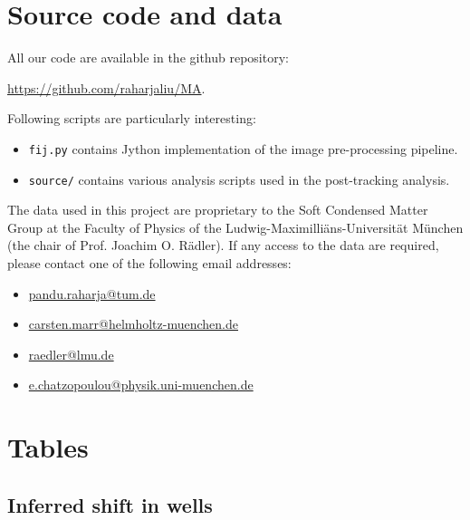 \documentclass[pdftex,12pt,a4paper]{report}
\begin{document}
\begin{appendices}
\newpage

\chapter{Source code and data}

{
\flushleft

All our code are available in the github repository:

\begin{center}
\href{https://github.com/raharjaliu/MA}{https://github.com/raharjaliu/MA}.
\end{center}

Following scripts are particularly interesting:

\begin{itemize}
\item \texttt{fij.py} contains Jython implementation of the image pre-processing pipeline.
\item \texttt{source/} contains various analysis scripts used in the post-tracking analysis.
\end{itemize}
}

The data used in this project are proprietary to the Soft Condensed Matter Group at the Faculty of Physics of the Ludwig-Maximilli\"ans-Universit\"at M\"unchen (the chair of Prof. Joachim O. R\"adler). If any access to the data are required, please contact one of the following email addresses:

\begin{itemize}
\item \href{mailto:pandu.raharja@tum.de}{pandu.raharja@tum.de}
\item \href{mailto:carsten.marr@helmholtz-muenchen.de}{carsten.marr@helmholtz-muenchen.de}
\item \href{raedler@lmu.de}{raedler@lmu.de}
\item \href{e.chatzopoulou@physik.uni-muenchen.de}{e.chatzopoulou@physik.uni-muenchen.de}
\end{itemize}


\chapter{Tables}
\label{chapter:appendix_tables}

\section{Inferred shift in wells}


\end{appendices}
\end{document}
